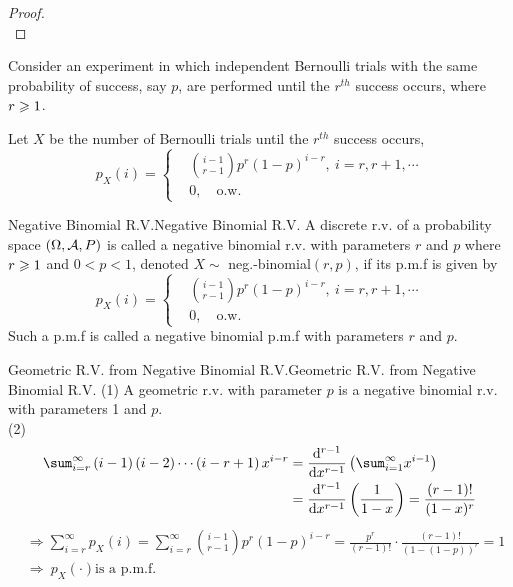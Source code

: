\documentclass{elegantbook}
\begin{document}
\begin{proof}
\\[4cm]\vspace{0.01cm}
\end{proof}

Consider an experiment in which independent Bernoulli trials with the same
probability of success, say $p$, are performed until the $r^{th}$ success occurs, where $r\geqslant1$.

Let $X$ be the number of Bernoulli trials until the  $r^{th}$ success occurs,
$$
p_X (i)=
\left\{\begin{aligned}
&\binom {i-1} {r-1} p^r(1-p)^{i-r},\   i=r,r+1,\cdots\\
&0,\quad\text{o.w.}
\end{aligned}        
\right.   
$$

\begin{definition}{Negative Binomial R.V.}{Negative Binomial R.V.}
A discrete r.v. of a probability space $(\Omega,\mathcal{A}, P)$ is called a negative binomial r.v. with parameters $r$ and $p$ where $r\geqslant1$ and $0<p<1$, denoted $X\sim$ neg.-binomial$(r,p)$, if its p.m.f is given by
$$
p_X (i)=
\left\{\begin{aligned}
&\binom {i-1} {r-1} p^r(1-p)^{i-r},\   i=r,r+1,\cdots\\
&0,\quad\text{o.w.}
\end{aligned}        
\right.   
$$
Such a p.m.f is called a negative binomial p.m.f with parameters $r$ and $p$.
\end{definition}

\begin{remark}{Geometric R.V. from Negative Binomial R.V.}{Geometric R.V. from Negative Binomial R.V.}
(1) A geometric r.v. with parameter $p$ is a negative binomial r.v. with parameters 1 and $p$.\\
(2)
$$
\begin{aligned}
\sum_{i=r}^{\infty}\left(i-1\right)\left(i-2\right)\cdots\left(i-r+1\right)x^{i-r}&=\frac{\dif^{r-1}}{\dif x^{r-1}}\left(\sum_{i=1}^{\infty}x^{i-1}\right)\\
&=\frac{\dif^{r-1}}{\dif x^{r-1}}\left(\frac{1}{1-x}\right)=\frac{\left(r-1\right)!}{(1-x)^r}\\
\end{aligned}
$$
$$
\begin{aligned}
&\Rightarrow\sum_{i=r}^{\infty}{p_X\left(i\right)}=\sum_{i=r}^{\infty}{\binom{i-1}{r-1}p^r(1-p)^{i-r}}=\frac{p^r}{\left(r-1\right)!}\cdot\frac{\left(r-1\right)!}{(1-(1-p))^r}=1\\
   &\Rightarrow\ p_X\left(\cdot\right) \text{is a p.m.f.}
   \end{aligned}
$$
\end{remark}
\end{document}
